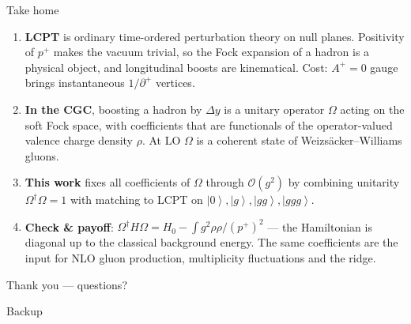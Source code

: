 \documentclass[9pt,aspectratio=169]{beamer}
\newcommand{\hl}[1]{\textcolor{acc}{#1}}
\newcommand{\hb}[1]{\textcolor{blu}{#1}}
\newcommand{\pp}{p^{+}}
\newcommand{\Om}{\Omega}
\newcommand{\ket}[1]{\left|#1\right\rangle}
\begin{document}
\begin{frame}{Take home}
\begin{enumerate}
  \item \textbf{LCPT} is ordinary time-ordered perturbation theory on null planes.
        Positivity of $\pp$ makes the vacuum trivial, so the \hl{Fock expansion of a
        hadron is a physical object}, and longitudinal boosts are kinematical.
        Cost: $A^{+}=0$ gauge brings \hb{instantaneous $1/\partial^{+}$ vertices}.
  \medskip
  \item \textbf{In the CGC}, boosting a hadron by $\Delta y$ is a \hl{unitary operator $\Om$}
        acting on the soft Fock space, with coefficients that are functionals of the
        \hb{operator-valued} valence charge density $\rho$. At LO $\Om$ is a coherent
        state of Weizs\"acker--Williams gluons.
  \medskip
  \item \textbf{This work} fixes \hl{all} coefficients of $\Om$ through $\mathcal{O}(g^{2})$
        by combining \hb{unitarity} $\Om^{\dagger}\Om=1$ with \hb{matching to LCPT}
        on $\ket0,\ket g,\ket{gg},\ket{ggg}$.
  \medskip
  \item \textbf{Check \& payoff}: $\Om^{\dagger}H\Om=H_{0}-\int g^{2}\rho\rho/(\pp)^{2}$ ---
        the Hamiltonian is diagonal up to the classical background energy. The same
        coefficients are the input for \hl{NLO gluon production, multiplicity fluctuations
        and the ridge}.
\end{enumerate}
\vfill
\begin{center}\hl{\large Thank you --- questions?}\end{center}
\end{frame}

\appendix
\begin{frame}[standout]
Backup
\end{frame}
\end{document}
